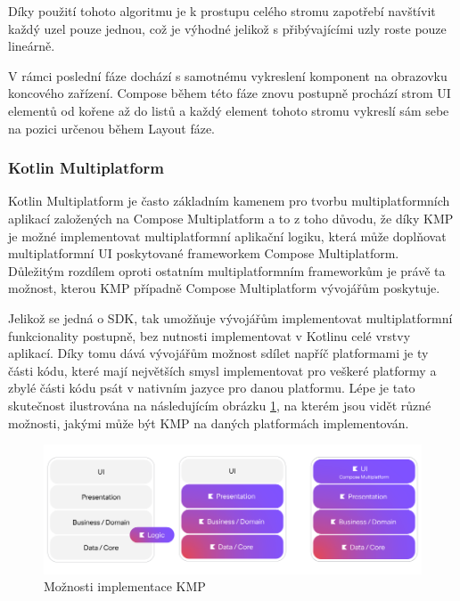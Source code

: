 Díky použití tohoto algoritmu je k prostupu celého stromu zapotřebí navštívit každý uzel pouze jednou, což je výhodné jelikož
s přibývajícími uzly roste pouze lineárně. \cite{jetpackPhases}

V rámci poslední fáze dochází s samotnému vykreslení komponent na obrazovku koncového zařízení. \cite{jetpackPhases}
Compose během této fáze znovu postupně prochází strom UI elementů od kořene až do listů a každý element tohoto stromu vykreslí sám sebe 
na pozici určenou během Layout fáze. \cite{jetpackPhases}

\subsubsection{Kotlin Multiplatform} \label{kmpSection}



Kotlin Multiplatform je často základním kamenem pro tvorbu multiplatformních aplikací založených na Compose Multiplatform a to
z toho důvodu, že díky KMP je možné implementovat multiplatformní aplikační logiku, která může doplňovat multiplatformní UI 
poskytované frameworkem Compose Multiplatform. \cite{KMPUseCases} Důležitým rozdílem oproti ostatním multiplatformním frameworkům 
je právě ta možnost, kterou KMP případně Compose Multiplatform vývojářům poskytuje. 

Jelikož se jedná o SDK, tak umožňuje vývojářům implementovat multiplatformní funkcionality postupně, bez nutnosti implementovat 
v Kotlinu celé vrstvy aplikací. Díky tomu dává vývojářům možnost sdílet napříč platformami je ty části kódu, které mají největších
smysl implementovat pro veškeré platformy a zbylé části kódu psát v nativním jazyce pro danou platformu. \cite{KMP}
Lépe je tato skutečnost ilustrována na následujícím obrázku \ref{fig:KMP_vrstvy}, na kterém jsou vidět různé možnosti,
jakými může být KMP na daných platformách implementován.

\begin{figure}[H]
  \centering
  \includegraphics[width=1\textwidth]{KMP_vrstvy.png}
  \caption{Možnosti implementace KMP}
  \label{fig:KMP_vrstvy}
\end{figure}

